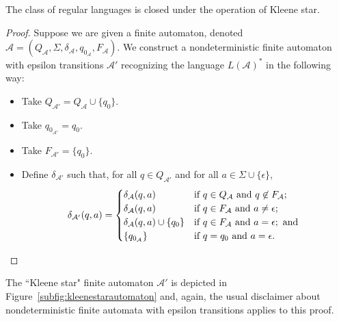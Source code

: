 \begin{theorem}\label{thm:FAclosurestar}
The class of regular languages is closed under the operation of Kleene star.

\begin{proof}
Suppose we are given a finite automaton, denoted $\mathcal{A} = (Q_{\mathcal{A}}, \Sigma, \delta_{\mathcal{A}}, \allowbreak q_{0_{\mathcal{A}}}, F_{\mathcal{A}})$. We construct a nondeterministic finite automaton with epsilon transitions $\mathcal{A}'$ recognizing the language $L(\mathcal{A})^{*}$ in the following way:
\begin{itemize}
\item Take $Q_{\mathcal{A}'} = Q_{\mathcal{A}} \cup \{q_{0}\}$.
\item Take $q_{0_{\mathcal{A}'}} = q_{0}$.
\item Take $F_{\mathcal{A}'} = \{q_{0}\}$.
\item Define $\delta_{\mathcal{A}'}$ such that, for all $q \in Q_{\mathcal{A}'}$ and for all $a \in \Sigma \cup \{\epsilon\}$,
\begin{equation*}
\delta_{\mathcal{A}'}(q, a) = 
\begin{cases}
\delta_{\mathcal{A}}(q, a)				& \text{if } q \in Q_{\mathcal{A}} \text{ and } q \not\in F_{\mathcal{A}}; \\
\delta_{\mathcal{A}}(q, a)				& \text{if } q \in F_{\mathcal{A}} \text{ and } a \neq \epsilon; \\
\delta_{\mathcal{A}}(q, a) \cup \{q_{0}\}	& \text{if } q \in F_{\mathcal{A}} \text{ and } a = \epsilon; \text{ and } \\
\{q_{0_{\mathcal{A}}}\}				& \text{if } q = q_{0} \text{ and } a = \epsilon.
\end{cases}
\qedhere
\end{equation*}
\end{itemize}
\end{proof}
\end{theorem}

The ``Kleene star" finite automaton $\mathcal{A}'$ is depicted in Figure~\ref{subfig:kleenestarautomaton} and, again, the usual disclaimer about nondeterministic finite automata with epsilon transitions applies to this proof.

